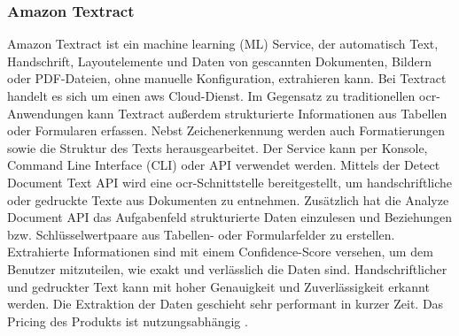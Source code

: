 \subsubsection{Amazon Textract}
Amazon Textract ist ein machine learning (ML) Service, der automatisch Text, Handschrift, Layoutelemente und Daten von gescannten Dokumenten, Bildern oder PDF-Dateien, ohne manuelle Konfiguration, extrahieren kann. Bei Textract handelt es sich um einen \gls{aws} Cloud-Dienst. Im Gegensatz zu traditionellen \gls{ocr}-Anwendungen kann Textract außerdem strukturierte Informationen aus Tabellen oder Formularen erfassen. Nebst Zeichenerkennung werden auch Formatierungen sowie die Struktur des Texts herausgearbeitet. Der Service kann per Konsole, Command Line Interface (CLI) oder API verwendet werden. Mittels der Detect Document Text API wird eine \gls{ocr}-Schnittstelle bereitgestellt, um handschriftliche oder gedruckte Texte aus Dokumenten zu entnehmen. Zusätzlich hat die Analyze Document API das Aufgabenfeld strukturierte Daten einzulesen und Beziehungen bzw. Schlüsselwertpaare aus Tabellen- oder Formularfelder zu erstellen. Extrahierte Informationen sind mit einem Confidence-Score versehen, um dem Benutzer mitzuteilen, wie exakt und verlässlich die Daten sind. Handschriftlicher und gedruckter Text kann mit hoher Genauigkeit und Zuverlässigkeit erkannt werden. Die Extraktion der Daten geschieht sehr performant in kurzer Zeit. Das Pricing des Produkts ist nutzungsabhängig \cite{textract}.

